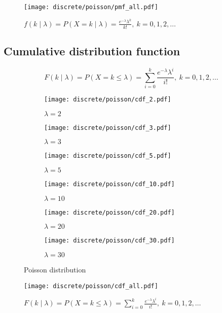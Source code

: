 \begin{figure}[H]
	\texttt{[image: discrete/poisson/pmf\_all.pdf]}
	\caption{$f(k \mid \lambda) = P(X = k \mid \lambda) = \frac{e^{-\lambda} \lambda^k}{k!}, \ k = 0, 1, 2, \ldots$}
\end{figure}

\subsection{Cumulative distribution function}
\[
	F(k \mid \lambda) = P(X = k \leq \lambda) = \sum_{i = 0}^{k} \frac{e^{-\lambda} \lambda^i}{i!}, \ k = 0, 1, 2, \ldots
\]

\begin{figure}[H]
	\centering
	\begin{subfigure}[b]{0.45\textwidth}
		\texttt{[image: discrete/poisson/cdf\_2.pdf]}
		\caption{$\lambda = 2$}
	\end{subfigure}
	\begin{subfigure}[b]{0.45\textwidth}
		\texttt{[image: discrete/poisson/cdf\_3.pdf]}
		\caption{$\lambda = 3$}
	\end{subfigure}
	\begin{subfigure}[b]{0.45\textwidth}
		\texttt{[image: discrete/poisson/cdf\_5.pdf]}
		\caption{$\lambda = 5$}
	\end{subfigure}
	\begin{subfigure}[b]{0.45\textwidth}
		\texttt{[image: discrete/poisson/cdf\_10.pdf]}
		\caption{$\lambda = 10$}
	\end{subfigure}
	\begin{subfigure}[b]{0.45\textwidth}
		\texttt{[image: discrete/poisson/cdf\_20.pdf]}
		\caption{$\lambda = 20$}
	\end{subfigure}
	\begin{subfigure}[b]{0.45\textwidth}
		\texttt{[image: discrete/poisson/cdf\_30.pdf]}
		\caption{$\lambda = 30$}
	\end{subfigure}
	\caption{Poisson distribution}
\end{figure}

\begin{figure}[H]
	\texttt{[image: discrete/poisson/cdf\_all.pdf]}
	\caption{$F(k \mid \lambda) = P(X = k \leq \lambda) = \sum_{i = 0}^{k} \frac{e^{-\lambda} \lambda^i}{i!}, \ k = 0, 1, 2, \ldots$}
\end{figure}

